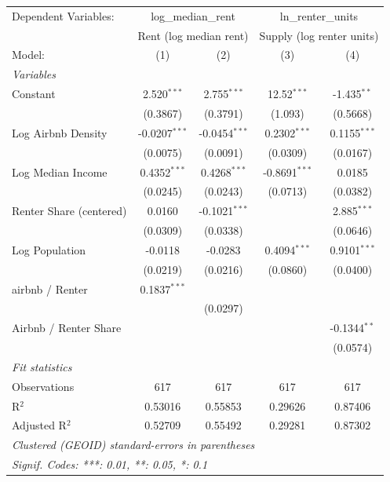 \documentclass[Department of Economics]{AEA}
\begin{document}
\begin{tabular}{lcccc}
   \tabularnewline \midrule \midrule
   Dependent Variables: & \multicolumn{2}{c}{log\_median\_rent} & \multicolumn{2}{c}{ln\_renter\_units}\\
    & \multicolumn{2}{c}{Rent (log median rent)} & \multicolumn{2}{c}{Supply (log renter units)} \\ 
   Model:                     & (1)             & (2)             & (3)             & (4)\\  
   \midrule
   \emph{Variables}\\
   Constant                   & 2.520$^{***}$   & 2.755$^{***}$   & 12.52$^{***}$   & -1.435$^{**}$\\   
                              & (0.3867)        & (0.3791)        & (1.093)         & (0.5668)\\   
   Log Airbnb Density         & -0.0207$^{***}$ & -0.0454$^{***}$ & 0.2302$^{***}$  & 0.1155$^{***}$\\   
                              & (0.0075)        & (0.0091)        & (0.0309)        & (0.0167)\\   
   Log Median Income          & 0.4352$^{***}$  & 0.4268$^{***}$  & -0.8691$^{***}$ & 0.0185\\   
                              & (0.0245)        & (0.0243)        & (0.0713)        & (0.0382)\\   
   Renter Share (centered)    & 0.0160          & -0.1021$^{***}$ &                 & 2.885$^{***}$\\   
                              & (0.0309)        & (0.0338)        &                 & (0.0646)\\   
   Log Population             & -0.0118         & -0.0283         & 0.4094$^{***}$  & 0.9101$^{***}$\\   
                              & (0.0219)        & (0.0216)        & (0.0860)        & (0.0400)\\   
   airbnb / Renter            & 0.1837$^{***}$  &                 &   \\   
                              &                 & (0.0297)        &                 &   \\   
   Airbnb / Renter Share      &                 &                 &                 & -0.1344$^{**}$\\   
                              &                 &                 &                 & (0.0574)\\   
   \midrule
   \emph{Fit statistics}\\
   Observations               & 617             & 617             & 617             & 617\\  
   R$^2$                      & 0.53016         & 0.55853         & 0.29626         & 0.87406\\  
   Adjusted R$^2$             & 0.52709         & 0.55492         & 0.29281         & 0.87302\\  
   \midrule \midrule
   \multicolumn{5}{l}{\emph{Clustered (GEOID) standard-errors in parentheses}}\\
   \multicolumn{5}{l}{\emph{Signif. Codes: ***: 0.01, **: 0.05, *: 0.1}}\\
\end{tabular}
\end{document}
